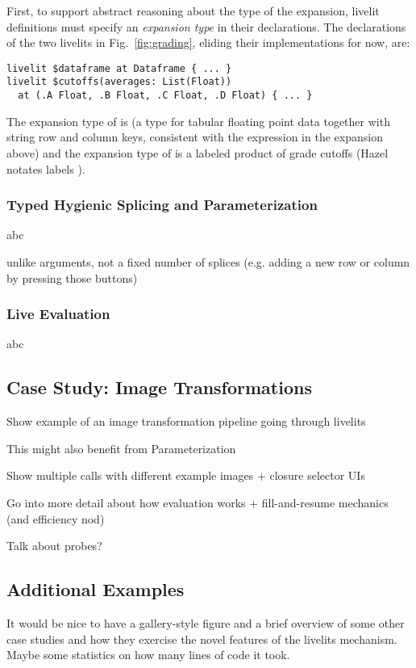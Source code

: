 First, to support abstract reasoning about the type of the expansion, 
livelit definitions must specify an \emph{expansion type} in their declarations.
The declarations of the two livelits in Fig.~\ref{fig:grading}, 
eliding their implementations for now, are:
\begin{lstlisting}[numbers=none]
livelit $dataframe at Dataframe { ... }
livelit $cutoffs(averages: List(Float)) 
  at (.A Float, .B Float, .C Float, .D Float) { ... }
\end{lstlisting}
The expansion type of  is  
(a type for tabular floating point data together with string row and column keys, consistent with the expression in the expansion above)
and the expansion type of  is a labeled product of grade cutoffs (Hazel notates labels ).

\subsubsection{Typed Hygienic Splicing and Parameterization} abc

unlike arguments, not a fixed number of splices (e.g. adding a new row or column by pressing those buttons)

\subsubsection{Live Evaluation} abc

\subsection{Case Study: Image Transformations}\label{sec:image-transformation}
Show example of an image transformation pipeline going through livelits

This might also benefit from Parameterization

Show multiple calls with different example images + closure selector UIs

Go into more detail about how evaluation works + fill-and-resume mechanics (and efficiency nod)

Talk about probes?

\subsection{Additional Examples}\label{sec:additional-examples}
It would be nice to have a gallery-style figure and a brief overview of some other case studies
and how they exercise the novel features of the livelits mechanism. Maybe some statistics on how
many lines of code it took.
